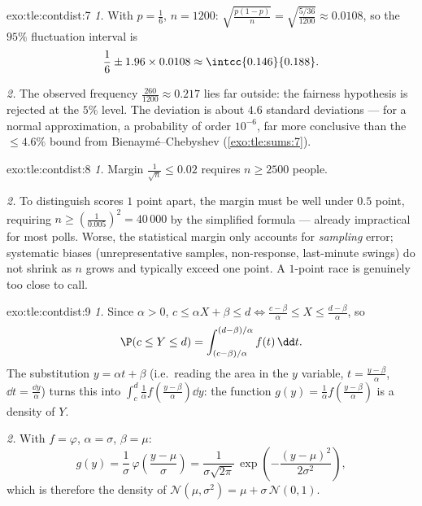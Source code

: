 \begin{solution}{exo:tle:contdist:7}
\emph{1.} With $p = \frac16$, $n = 1200$:
$\sqrt{\frac{p(1-p)}{n}} = \sqrt{\frac{5/36}{1200}} \approx 0.0108$, so the
$95\%$ fluctuation interval is
\[
\frac16 \pm 1.96 \times 0.0108 \approx \intcc{0.146}{0.188}.
\]

\emph{2.} The observed frequency $\frac{260}{1200} \approx 0.217$ lies far
outside: the fairness hypothesis is rejected at the $5\%$ level. The
deviation is about $4.6$ standard deviations --- for a normal
approximation, a probability of order $10^{-6}$, far more conclusive than
the $\leq 4.6\%$ bound from Bienaymé--Chebyshev
(\cref{exo:tle:sums:7}).
\end{solution}

\begin{solution}{exo:tle:contdist:8}
\emph{1.} Margin $\frac{1}{\sqrt n} \leq 0.02$ requires
$n \geq 2500$ people.

\emph{2.} To distinguish scores $1$ point apart, the margin must be well
under $0.5$ point, requiring $n \geq \left(\frac{1}{0.005}\right)^2 =
40\,000$ by the simplified formula --- already impractical for most polls.
Worse, the statistical margin only accounts for \emph{sampling} error;
systematic biases (unrepresentative samples, non-response, last-minute
swings) do not shrink as $n$ grows and typically exceed one point. A
$1$-point race is genuinely too close to call.
\end{solution}

\begin{solution}{exo:tle:contdist:9}
\emph{1.} Since $\alpha > 0$, $c \leq \alpha X + \beta \leq d
\iff \frac{c - \beta}{\alpha} \leq X \leq \frac{d - \beta}{\alpha}$, so
\[
\P(c \leq Y \leq d)
= \int_{(c-\beta)/\alpha}^{(d-\beta)/\alpha} f(t)\,\dd t .
\]
The substitution $y = \alpha t + \beta$ (i.e.\ reading the area in the $y$
variable, $t = \frac{y - \beta}{\alpha}$, $\dd t = \frac{\dd y}{\alpha}$)
turns this into
$\int_c^d \frac{1}{\alpha} f\left(\frac{y-\beta}{\alpha}\right)\dd y$: the
function $g(y) = \frac1\alpha f\left(\frac{y-\beta}{\alpha}\right)$ is a
density of $Y$.

\emph{2.} With $f = \varphi$, $\alpha = \sigma$, $\beta = \mu$:
\[
g(y) = \frac{1}{\sigma}\,\varphi\!\left(\frac{y - \mu}{\sigma}\right)
= \frac{1}{\sigma\sqrt{2\pi}}\,
\exp\left(-\frac{(y-\mu)^2}{2\sigma^2}\right),
\]
which is therefore the density of
$\mathcal N(\mu, \sigma^2) = \mu + \sigma\,\mathcal N(0,1)$.
\end{solution}
